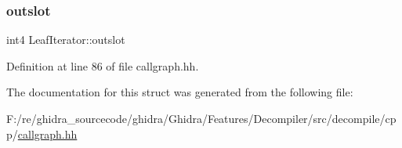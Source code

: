 \subsubsection{\texorpdfstring{outslot}{outslot}}
{\footnotesize\ttfamily int4 Leaf\+Iterator\+::outslot}



Definition at line 86 of file callgraph.\+hh.



The documentation for this struct was generated from the following file\+:\begin{DoxyCompactItemize}
\item 
F\+:/re/ghidra\+\_\+sourcecode/ghidra/\+Ghidra/\+Features/\+Decompiler/src/decompile/cpp/\mbox{\hyperlink{callgraph_8hh}{callgraph.\+hh}}\end{DoxyCompactItemize}
